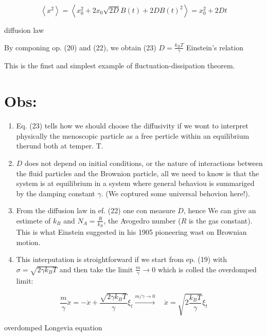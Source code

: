 $$ \left\langle x^{2}\right\rangle=\left\langle x_{0}^{2}+2 x_{0} \sqrt{2 D} B(t)+2 D B(t)^{2}\right\rangle=x_{0}^{2}+2 D t $$

diffusion law

By componing op. (20) and (22), we obtain
(23) $D=\frac{k_{B} T}{\gamma}$ Einstein's relation

This is the finst and simplest example of fluctuation-dissipation theorem.

\section*{Obs:}
\begin{enumerate}
  \item Eq. (23) tells how we should choose the diffusivity if we wont to interpret physically the menoscopic particle as a free perticle within an equilibrium therund both at temper. T.
  \item $D$ does not depend on initial conditions, or the nature of interactions between the fluid particles and the Brownion particle, all we need to know is that the system is at equilibrium in a system where general behaviou is summariged by the damping constant $\gamma$. (We coptured some universal behovion here!).
  \item From the diffusion law in ef. (22) one con measure $D$, hence We can give an estimete of $k_{B}$ and $N_{A}=\frac{R}{k_{B}}$, the Avogedro number ($R$ is the gas constant). This is what Einstein suggested in his 1905 pioneering wast on Brownian motion.
  \item This interputation is stroightforward if we start from ep. (19) with $\sigma=\sqrt{2 \gamma k_{B} T}$ and then take the limit $\frac{m}{\gamma} \rightarrow 0$ which is colled the overdomped limit:
\end{enumerate}

$$ \frac{m}{\gamma} \ddot{x}=-\dot{x}+\frac{\sqrt{2 \gamma k_{B} T}}{\gamma} \xi_{t} \xrightarrow{m / \gamma \rightarrow 0} \quad \dot{x}=\sqrt{2 \frac{k_{B} T}{\gamma}} \xi_{t} $$

overdomped Longevia equation